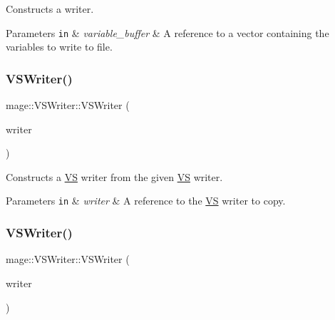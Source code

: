 Constructs a writer.


\begin{DoxyParams}[1]{Parameters}
\mbox{\tt in}  & {\em variable\+\_\+buffer} & A reference to a vector containing the variables to write to file. \\
\hline
\end{DoxyParams}
\hypertarget{classmage_1_1_v_s_writer_a77d146f812d9d37ee99c31133d3597b8}{}\label{classmage_1_1_v_s_writer_a77d146f812d9d37ee99c31133d3597b8} 
\subsubsection{\texorpdfstring{V\+S\+Writer()}{VSWriter()}\hspace{0.1cm}{\footnotesize\ttfamily [2/3]}}
{\footnotesize\ttfamily mage\+::\+V\+S\+Writer\+::\+V\+S\+Writer (\begin{DoxyParamCaption}\item[{const \hyperlink{classmage_1_1_v_s_writer}{V\+S\+Writer} \&}]{writer }\end{DoxyParamCaption})\hspace{0.3cm}{\ttfamily [delete]}}

Constructs a \hyperlink{structmage_1_1_v_s}{VS} writer from the given \hyperlink{structmage_1_1_v_s}{VS} writer.


\begin{DoxyParams}[1]{Parameters}
\mbox{\tt in}  & {\em writer} & A reference to the \hyperlink{structmage_1_1_v_s}{VS} writer to copy. \\
\hline
\end{DoxyParams}
\hypertarget{classmage_1_1_v_s_writer_a744553658a13bbe59349058579fafb56}{}\label{classmage_1_1_v_s_writer_a744553658a13bbe59349058579fafb56} 
\subsubsection{\texorpdfstring{V\+S\+Writer()}{VSWriter()}\hspace{0.1cm}{\footnotesize\ttfamily [3/3]}}
{\footnotesize\ttfamily mage\+::\+V\+S\+Writer\+::\+V\+S\+Writer (\begin{DoxyParamCaption}\item[{\hyperlink{classmage_1_1_v_s_writer}{V\+S\+Writer} \&\&}]{writer }\end{DoxyParamCaption})\hspace{0.3cm}{\ttfamily [default]}}

